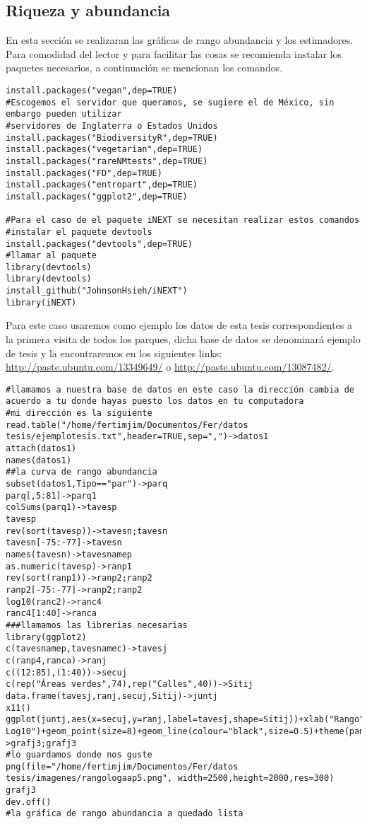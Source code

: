 \documentclass[letterpaper,12pt]{article}
\begin{document}
\subsection{Riqueza y abundancia}
En esta sección se realizaran las gráficas de rango abundancia y los estimadores.
Para comodidad del lector y para facilitar las cosas se recomienda instalar los paquetes necesarios,
a continuación se mencionan los comandos.
 \begin{lstlisting}
install.packages("vegan",dep=TRUE)
#Escogemos el servidor que queramos, se sugiere el de México, sin embargo pueden utilizar 
#servidores de Inglaterra o Estados Unidos
install.packages("BiodiversityR",dep=TRUE)
install.packages("vegetarian",dep=TRUE)
install.packages("rareNMtests",dep=TRUE)
install.packages("FD",dep=TRUE)
install.packages("entropart",dep=TRUE)
install.packages("ggplot2",dep=TRUE)

#Para el caso de el paquete iNEXT se necesitan realizar estos comandos 
#instalar el paquete devtools
install.packages("devtools",dep=TRUE)
#llamar al paquete
library(devtools)
library(devtools)
install_github("JohnsonHsieh/iNEXT")
library(iNEXT)
\end{lstlisting}
Para este caso usaremos como ejemplo los datos de esta tesis correspondientes a la primera visita de todos los parques, dicha base de datos 
se denominará ejemplo de tesis y la encontraremos en los  siguientes links: \url{http://paste.ubuntu.com/13349649/} o \url{http://paste.ubuntu.com/13087482/}.
\begin{lstlisting}
#llamamos a nuestra base de datos en este caso la dirección cambia de acuerdo a tu donde hayas puesto los datos en tu computadora
#mi dirección es la siguiente
read.table("/home/fertimjim/Documentos/Fer/datos tesis/ejemplotesis.txt",header=TRUE,sep=",")->datos1
attach(datos1)
names(datos1)
##la curva de rango abundancia 
subset(datos1,Tipo=="par")->parq
parq[,5:81]->parq1
colSums(parq1)->tavesp
tavesp
rev(sort(tavesp))->tavesn;tavesn
tavesn[-75:-77]->tavesn
names(tavesn)->tavesnamep
as.numeric(tavesp)->ranp1
rev(sort(ranp1))->ranp2;ranp2
ranp2[-75:-77]->ranp2;ranp2
log10(ranc2)->ranc4
ranc4[1:40]->ranca
###llamamos las librerias necesarias
library(ggplot2)
c(tavesnamep,tavesnamec)->tavesj
c(ranp4,ranca)->ranj
c((12:85),(1:40))->secuj
c(rep("Áreas verdes",74),rep("Calles",40))->Sitij
data.frame(tavesj,ranj,secuj,Sitij)->juntj
x11()
ggplot(juntj,aes(x=secuj,y=ranj,label=tavesj,shape=Sitij))+xlab("Rango")+ylab("Abundancias  Log10")+geom_point(size=8)+geom_line(colour="black",size=0.5)+theme(panel.background=element_blank(),text=element_text(family="serif"),legend.position="top",legend.title=element_blank(),panel.grid.major.x=element_blank(),panel.grid.major.y=element_blank(),axis.text=element_text(colour="black"))+ggtitle("")+geom_text(size=2.5,family="serif",fontface=3,angle=65,hjust=-0.5,vjust=-0.5)+scale_x_continuous(breaks=c(1,40,12,85),labels=c("1","40","1","74"),limits=c(0,85))+scale_shape_manual(values=c("*","°"))+scale_color_manual(values=c("Gray10","Black"))+scale_y_continuous(limits=c(-0.5,4))->grafj3;grafj3
#lo guardamos donde nos guste
png(file="/home/fertimjim/Documentos/Fer/datos tesis/imagenes/rangologaap5.png", width=2500,height=2000,res=300)
grafj3
dev.off()
#la gráfica de rango abundancia a quedado lista
\end{lstlisting}
\end{document}
